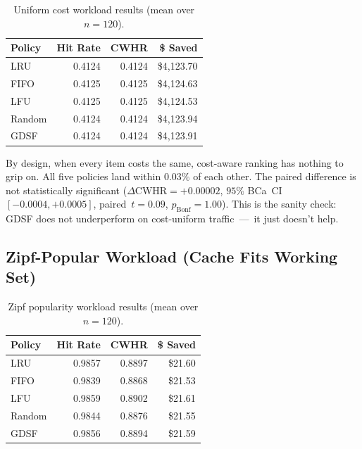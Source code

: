\documentclass[sigconf, nonacm, review=false, screen=true]{acmart}
\begin{document}
\begin{table}[t]
  \centering
  \caption{Uniform cost workload results (mean over $n=120$).}
  \label{tab:uniform}
  \begin{tabular}{lrrr}
    \toprule
    Policy & Hit Rate & CWHR & \$ Saved \\
    \midrule
    LRU     & 0.4124 & 0.4124 & \$4{,}123.70 \\
    FIFO    & 0.4125 & 0.4125 & \$4{,}124.63 \\
    LFU     & 0.4125 & 0.4125 & \$4{,}124.53 \\
    Random  & 0.4124 & 0.4124 & \$4{,}123.94 \\
    GDSF    & 0.4124 & 0.4124 & \$4{,}123.91 \\
    \bottomrule
  \end{tabular}
\end{table}

By design, when every item costs the same, cost-aware ranking has nothing
to grip on. All five policies land within $0.03\%$ of each other. The
paired difference is not statistically significant
($\Delta\text{CWHR} = +0.00002$, $95\%$ BCa~CI $[-0.0004, +0.0005]$,
paired~$t = 0.09$, $p_{\text{Bonf}} = 1.00$). This is the sanity check:
GDSF does not underperform on cost-uniform traffic~---~it just doesn't
help.

\subsection{Zipf-Popular Workload (Cache Fits Working Set)}

\begin{table}[t]
  \centering
  \caption{Zipf popularity workload results (mean over $n=120$).}
  \label{tab:zipf}
  \begin{tabular}{lrrr}
    \toprule
    Policy & Hit Rate & CWHR & \$ Saved \\
    \midrule
    LRU     & 0.9857 & 0.8897 & \$21.60 \\
    FIFO    & 0.9839 & 0.8868 & \$21.53 \\
    LFU     & 0.9859 & 0.8902 & \$21.61 \\
    Random  & 0.9844 & 0.8876 & \$21.55 \\
    GDSF    & 0.9856 & 0.8894 & \$21.59 \\
    \bottomrule
  \end{tabular}
\end{table}
\end{document}

